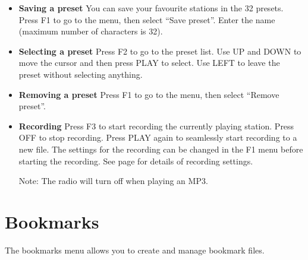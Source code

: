 \begin{itemize}
  
\item \textbf{Saving a preset}
  You can save your favourite stations in the 32 presets. Press F1 to go to the menu, then select ``Save preset''. Enter the name (maximum number of characters is 32).
  
\item \textbf{Selecting a preset}
  Press F2 to go to the preset list. Use UP and DOWN to move the cursor and then press PLAY to select. Use LEFT to leave the preset without selecting anything.
  
\item \textbf{Removing a preset}
  Press F1 to go to the menu, then select ``Remove preset''.
  
\item \textbf{Recording}
  Press F3 to start recording the currently playing station. Press OFF to stop recording. Press PLAY again to seamlessly start recording to a new file. The settings for the recording can be changed in the F1 menu before starting the recording. See page \pageref{ref:Recordingsettings} for details of recording settings.
  
  Note: The radio will turn off when playing an MP3.
\end{itemize}

\section{\label{ref:Bookmarkconfig}\label{ref:Bookmarkmenu}Bookmarks}
The bookmarks menu allows you to create and manage bookmark files.

